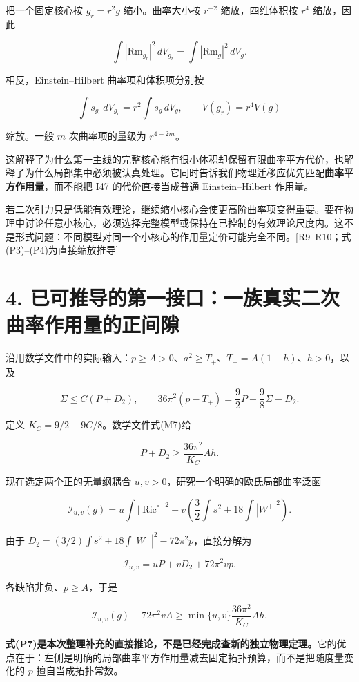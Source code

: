 \documentclass[UTF8,a4paper,11pt,fontset=fandol]{ctexart}
\begin{document}
把一个固定核心按 \(g_r=r^2g\) 缩小。曲率大小按 \(r^{-2}\)
缩放，四维体积按 \(r^4\) 缩放，因此

\[
\int|\mathrm{Rm}_{g_r}|^2\,dV_{g_r}
=\int|\mathrm{Rm}_g|^2\,dV_g.
\tag{P3}
\]

相反，Einstein--Hilbert 曲率项和体积项分别按

\[
\int s_{g_r}\,dV_{g_r}=r^2\int s_g\,dV_g,
\qquad V(g_r)=r^4V(g)
\tag{P4}
\]

缩放。一般 \(m\) 次曲率项的量级为 \(r^{4-2m}\)。

这解释了为什么第一主线的完整核心能有很小体积却保留有限曲率平方代价，也解释了为什么局部集中必须被认真处理。它同时告诉我们物理迁移应优先匹配\textbf{曲率平方作用量}，而不能把
I47 的代价直接当成普通 Einstein--Hilbert 作用量。

若二次引力只是低能有效理论，继续缩小核心会使更高阶曲率项变得重要。要在物理中讨论任意小核心，必须选择完整模型或保持在已控制的有效理论尺度内。这不是形式问题：不同模型对同一个小核心的作用量定价可能完全不同。{[}R9--R10；式(P3)--(P4)为直接缩放推导{]}

\section{4.
已可推导的第一接口：一族真实二次曲率作用量的正间隙}\label{ux5df2ux53efux63a8ux5bfcux7684ux7b2cux4e00ux63a5ux53e3ux4e00ux65cfux771fux5b9eux4e8cux6b21ux66f2ux7387ux4f5cux7528ux91cfux7684ux6b63ux95f4ux9699}

沿用数学文件中的实际输入：\(p\ge A>0\)、\(a^2\ge T_+\)、\(T_+=A(1-h)\)、\(h>0\)，以及

\[
\Sigma\le C(P+D_2),\qquad
36\pi^2(p-T_+)=\frac92P+\frac98\Sigma-D_2.
\]

定义 \(K_C=9/2+9C/8\)。数学文件式(M7)给

\[
P+D_2\ge\frac{36\pi^2}{K_C}Ah.
\tag{P5}
\]

现在选定两个正的无量纲耦合 \(u,v>0\)，研究一个明确的欧氏局部曲率泛函

\[
\mathscr I_{u,v}(g)=
 u\int|\operatorname{Ric}^{\circ}|^2
 +v\left(\frac32\int s^2+18\int|W^+|^2\right).
\tag{P6}
\]

由于 \(D_2=(3/2)\int s^2+18\int|W^+|^2-72\pi^2p\)，直接分解为

\[
\mathscr I_{u,v}=uP+vD_2+72\pi^2vp.
\]

各缺陷非负、\(p\ge A\)，于是

\[
\boxed{
\mathscr I_{u,v}(g)-72\pi^2vA
\ge\min\{u,v\}\frac{36\pi^2}{K_C}Ah.
}
\tag{P7}
\]

\textbf{式(P7)是本次整理补充的直接推论，不是已经完成查新的独立物理定理。}它的优点在于：左侧是明确的局部曲率平方作用量减去固定拓扑预算，而不是把随度量变化的
\(p\) 擅自当成拓扑常数。
\end{document}
